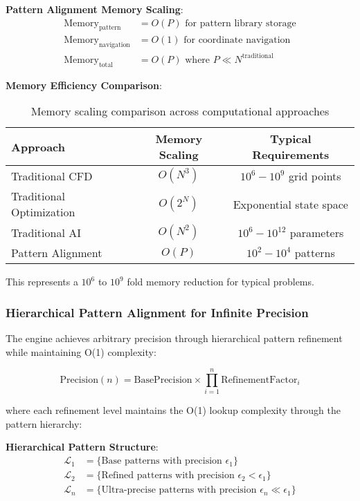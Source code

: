 \documentclass[11pt,a4paper]{article}
\theoremstyle{remark}
\begin{document}
\textbf{Pattern Alignment Memory Scaling}:
\begin{align}
\text{Memory}_{\text{pattern}} &= O(P) \text{ for pattern library storage} \\
\text{Memory}_{\text{navigation}} &= O(1) \text{ for coordinate navigation} \\
\text{Memory}_{\text{total}} &= O(P) \text{ where } P \ll N^{\text{traditional}}
\end{align}

\textbf{Memory Efficiency Comparison}:
\begin{table}[H]
\centering
\begin{tabular}{lcc}
\toprule
Approach & Memory Scaling & Typical Requirements \\
\midrule
Traditional CFD & $O(N^3)$ & $10^6 - 10^9$ grid points \\
Traditional Optimization & $O(2^N)$ & Exponential state space \\
Traditional AI & $O(N^2)$ & $10^6 - 10^{12}$ parameters \\
Pattern Alignment & $O(P)$ & $10^2 - 10^4$ patterns \\
\bottomrule
\end{tabular}
\caption{Memory scaling comparison across computational approaches}
\end{table}

This represents a $10^6$ to $10^9$ fold memory reduction for typical problems.

\subsubsection{Hierarchical Pattern Alignment for Infinite Precision}

The engine achieves arbitrary precision through hierarchical pattern refinement while maintaining O(1) complexity:

\begin{equation}
\text{Precision}(n) = \text{BasePrecision} \times \prod_{i=1}^{n} \text{RefinementFactor}_i
\end{equation}

where each refinement level maintains the O(1) lookup complexity through the pattern hierarchy:

\textbf{Hierarchical Pattern Structure}:
\begin{align}
\mathcal{L}_1 &= \{\text{Base patterns with precision } \epsilon_1\} \\
\mathcal{L}_2 &= \{\text{Refined patterns with precision } \epsilon_2 < \epsilon_1\} \\
\mathcal{L}_n &= \{\text{Ultra-precise patterns with precision } \epsilon_n \ll \epsilon_1\}
\end{align}
\end{document}
